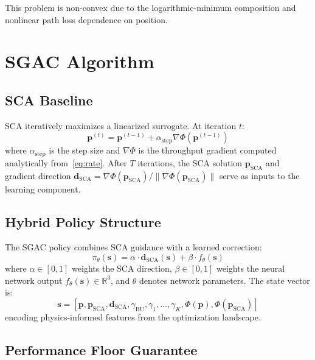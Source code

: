 \documentclass[journal]{IEEEtran}
\begin{document}
This problem is non-convex due to the logarithmic-minimum composition and nonlinear path loss dependence on position.

\section{SGAC Algorithm}

\subsection{SCA Baseline}

SCA iteratively maximizes a linearized surrogate. At iteration $t$:
\begin{equation}
\mathbf{p}^{(t)} = \mathbf{p}^{(t-1)} + \alpha_{\text{step}} \nabla\Phi(\mathbf{p}^{(t-1)})
\end{equation}
where $\alpha_{\text{step}}$ is the step size and $\nabla\Phi$ is the throughput gradient computed analytically from~\eqref{eq:rate}. After $T$ iterations, the SCA solution $\mathbf{p}_{\text{SCA}}$ and gradient direction $\mathbf{d}_{\text{SCA}} = \nabla\Phi(\mathbf{p}_{\text{SCA}})/\|\nabla\Phi(\mathbf{p}_{\text{SCA}})\|$ serve as inputs to the learning component.

\subsection{Hybrid Policy Structure}

The SGAC policy combines SCA guidance with a learned correction:
\begin{equation}
\pi_\theta(\mathbf{s}) = \alpha \cdot \mathbf{d}_{\text{SCA}}(\mathbf{s}) + \beta \cdot f_\theta(\mathbf{s})
\label{eq:policy}
\end{equation}
where $\alpha \in [0,1]$ weights the SCA direction, $\beta \in [0,1]$ weights the neural network output $f_\theta(\mathbf{s}) \in \mathbb{R}^3$, and $\theta$ denotes network parameters. The state vector is:
\begin{equation}
\mathbf{s} = [\mathbf{p}, \mathbf{p}_{\text{SCA}}, \mathbf{d}_{\text{SCA}}, \gamma_{\text{BU}}, \gamma_1, \ldots, \gamma_K, \Phi(\mathbf{p}), \Phi(\mathbf{p}_{\text{SCA}})]
\end{equation}
encoding physics-informed features from the optimization landscape.

\subsection{Performance Floor Guarantee}
\end{document}
